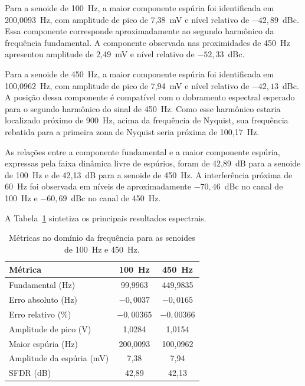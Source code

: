 \documentclass[a4paper,12pt]{fcte}
\begin{document}
Para a senoide de 100~Hz, a maior componente espúria foi identificada em 200,0093~Hz, com amplitude de pico de 7,38~mV e nível relativo de $-42,89$~dBc. Essa componente corresponde aproximadamente ao segundo harmônico da frequência fundamental. A componente observada nas proximidades de 450~Hz apresentou amplitude de 2,49~mV e nível relativo de $-52,33$~dBc.

Para a senoide de 450~Hz, a maior componente espúria foi identificada em 100,0962~Hz, com amplitude de pico de 7,94~mV e nível relativo de $-42,13$~dBc. A posição dessa componente é compatível com o dobramento espectral esperado para o segundo harmônico do sinal de 450~Hz. Como esse harmônico estaria localizado próximo de 900~Hz, acima da frequência de Nyquist, sua frequência rebatida para a primeira zona de Nyquist seria próxima de 100,17~Hz.

As relações entre a componente fundamental e a maior componente espúria, expressas pela faixa dinâmica livre de espúrios, foram de 42,89~dB para a senoide de 100~Hz e de 42,13~dB para a senoide de 450~Hz. A interferência próxima de 60~Hz foi observada em níveis de aproximadamente $-70,46$~dBc no canal de 100~Hz e $-60,69$~dBc no canal de 450~Hz.

A Tabela~\ref{tab:metricas_frequencia_senoides_altas} sintetiza os principais resultados espectrais.

\begin{table}[!htbp]
    \centering
    \caption{Métricas no domínio da frequência para as senoides de 100~Hz e 450~Hz.}
    \label{tab:metricas_frequencia_senoides_altas}
    \small
    \begin{tabular}{l c c}
        \hline
        \textbf{Métrica} &
        \textbf{100~Hz} &
        \textbf{450~Hz} \\
        \hline
        Fundamental (Hz)          & 99,9963  & 449,9835 \\
        Erro absoluto (Hz)        & $-0,0037$ & $-0,0165$ \\
        Erro relativo (\%)        & $-0,00365$ & $-0,00366$ \\
        Amplitude de pico (V)     & 1,0284   & 1,0154 \\
        Maior espúria (Hz)        & 200,0093 & 100,0962 \\
        Amplitude da espúria (mV) & 7,38     & 7,94 \\
        SFDR (dB)                 & 42,89    & 42,13 \\
        \hline
    \end{tabular}
\end{table}
\end{document}
